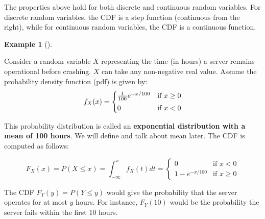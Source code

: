 \documentclass[
  letterpaper,
]{scrbook}
\theoremstyle{definition}
\theoremstyle{plain}
\theoremstyle{plain}
\theoremstyle{definition}
\newtheorem{example}{Example}[chapter]
\theoremstyle{remark}
\begin{document}
The properties above hold for both discrete and continuous random
variables. For discrete random variables, the CDF is a step function
(continuous from the right), while for continuous random variables, the
CDF is a continuous function.

\begin{tcolorbox}[enhanced jigsaw, bottomtitle=1mm, coltitle=black, toprule=.15mm, toptitle=1mm, bottomrule=.15mm, colback=white, arc=.35mm, opacityback=0, breakable, title={CDF of a continuous random variable}, titlerule=0mm, rightrule=.15mm, colbacktitle=quarto-callout-note-color!10!white, colframe=quarto-callout-note-color-frame, opacitybacktitle=0.6, leftrule=.75mm, left=2mm]

\begin{example}[]\protect\hypertarget{exm-cdf-continuous}{}\label{exm-cdf-continuous}

Consider a random variable \(X\) representing the time (in hours) a
server remains operational before crashing. \(X\) can take any
non-negative real value. Assume the probability density function (pdf)
is given by: \[
f_X(x)=
\begin{cases}
\frac{1}{100} e^{-x/100} & \text{if } x \ge 0 \\
\rule{0in}{3ex}0 & \text{if } x < 0
\end{cases}
\]

This probability distribution is called an \textbf{exponential
distribution with a mean of 100 hours}. We will define and talk about
mean later. The CDF is computed as follows:

\[
F_X(x) = P(X \le x) = \int_{-\infty}^x f_X(t) dt =
\begin{cases}
0 & \text{if } x < 0 \\
1 - e^{-x/100} & \text{if } x \ge 0
\end{cases}
\]

The CDF \(F_Y(y) = P(Y \le y)\) would give the probability that the
server operates for at most \(y\) hours. For instance, \(F_Y(10)\) would
be the probability the server fails within the first 10 hours.

\end{example}

\end{tcolorbox}


\backmatter
\end{document}
